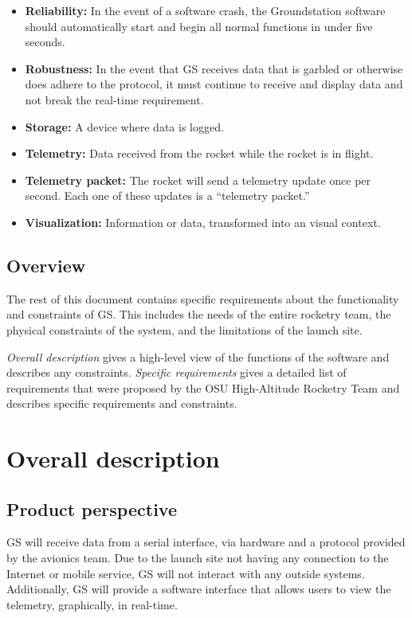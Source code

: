 \documentclass[10pt,draftclsnofoot,onecolumn]{IEEEtran}
\begin{document}
\begin{itemize}
		\item \textbf{Reliability:} In the event of a software crash, the Groundstation software should automatically
		start and begin all normal functions in under five seconds.
		\item \textbf{Robustness:} In the event that GS receives data that is garbled or otherwise does adhere
		to the protocol, it must continue to receive and display data and not break the real-time requirement.
		\item \textbf{Storage:} A device where data is logged.
		\item \textbf{Telemetry:} Data received from the rocket while the rocket is in flight.
		\item \textbf{Telemetry packet:} The rocket will send a telemetry update once per second. Each one of these updates is a ``telemetry packet.''
		\item \textbf{Visualization:} Information or data, transformed into an visual context.
	\end{itemize}

	\subsection{Overview}
	The rest of this document contains specific requirements about the functionality and constraints of GS. This includes
	the needs of the entire rocketry team, the physical constraints of the system, and the limitations of the launch site.

	\textit{Overall description} gives a high-level view of the functions of the software and describes any constraints.
	\textit{Specific requirements} gives a detailed list of requirements that were proposed by the OSU High-Altitude
	Rocketry Team and describes specific requirements and constraints.


	\section{Overall description}
	\subsection{Product perspective}
	GS will receive data from a serial interface, via hardware and a protocol provided by the avionics team.
	Due to the launch site not having any connection to the Internet or mobile service, GS will not interact with
	any outside systems.
	Additionally, GS will provide a software interface that allows users to view the telemetry,
	graphically, in real-time.
\end{document}

